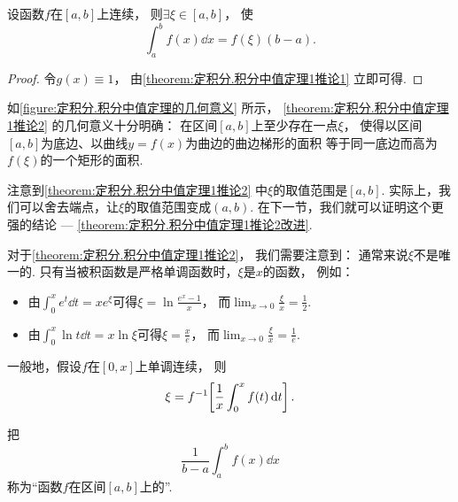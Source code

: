 \begin{corollary}\label{theorem:定积分.积分中值定理1推论2}
设函数\(f\)在\([a,b]\)上连续，
则\(\exists\xi\in[a,b]\)，
使\begin{equation}
	\int_a^b f(x) \dd{x} = f(\xi) (b-a).
\end{equation}
\begin{proof}
令\(g(x) \equiv 1\)，
由\cref{theorem:定积分.积分中值定理1推论1} 立即可得.
\end{proof}
\end{corollary}
\begin{remark}
如\cref{figure:定积分.积分中值定理的几何意义} 所示，
\cref{theorem:定积分.积分中值定理1推论2} 的几何意义十分明确：
在区间\([a,b]\)上至少存在一点\(\xi\)，
使得以区间\([a,b]\)为底边、以曲线\(y=f(x)\)为曲边的曲边梯形的面积
等于同一底边而高为\(f(\xi)\)的一个矩形的面积.
\end{remark}
\begin{remark}
注意到\cref{theorem:定积分.积分中值定理1推论2} 中\(\xi\)的取值范围是\([a,b]\).
实际上，我们可以舍去端点，让\(\xi\)的取值范围变成\((a,b)\).
在下一节，我们就可以证明这个更强的结论 --- \cref{theorem:定积分.积分中值定理1推论2改进}.
\end{remark}
\begin{remark}
对于\cref{theorem:定积分.积分中值定理1推论2}，
我们需要注意到：
通常来说\(\xi\)不是唯一的.
只有当被积函数是严格单调函数时，\(\xi\)是\(x\)的函数，
例如：\begin{itemize}
	\item 由\(\int_0^x e^t \dd{t} = x e^\xi\)可得\(\xi = \ln\frac{e^x-1}{x}\)，
	而\(\lim_{x\to0} \frac{\xi}{x} = \frac12\).
	\item 由\(\int_0^x \ln t \dd{t} = x \ln\xi\)可得\(\xi = \frac{x}{e}\)，
	而\(\lim_{x\to0} \frac{\xi}{x} = \frac1e\).
\end{itemize}

一般地，假设\(f\)在\([0,x]\)上单调连续，
则\begin{equation*}
	\xi = f^{-1}\kern-2pt\left[ \frac1x \int_0^x f(t) \dd{t} \right].
\end{equation*}
\end{remark}
\begin{definition}
把\begin{equation}
	\frac{1}{b-a} \int_a^b f(x) \dd{x}
\end{equation}
称为“函数\(f\)在区间\([a,b]\)上的”.
\end{definition}

